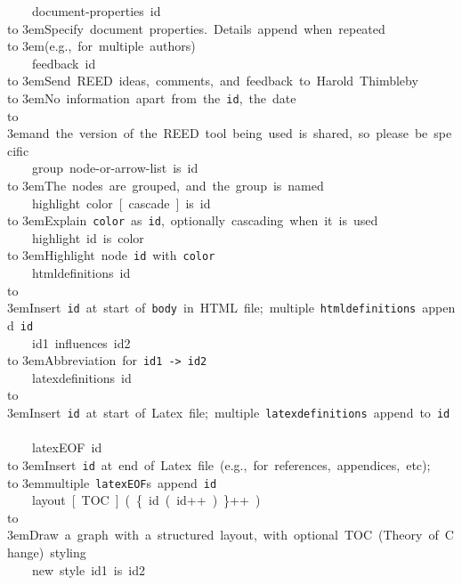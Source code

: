 {\hbox{}~~~~document-properties~id\\
\hbox to 3em{}{\rm Specify~document~properties.~Details~append~when~repeated}\\
\hbox to 3em{}{\rm (e.g.,~for~multiple~authors)}\\
\hbox{}~~~~feedback~id\\
\hbox to 3em{}{\rm Send~REED~ideas,~comments,~and~feedback~to~Harold~Thimbleby}\\
\hbox to 3em{}{\rm No~information~apart~from~the~\texttt{id},~the~date~}\\
\hbox to 3em{}{\rm and~the~version~of~the~REED~tool~being~used~is~shared,~so~please~be~specific}\\
\hbox{}~~~~group~node-or-arrow-list~is~id\\
\hbox to 3em{}{\rm The~nodes~are~grouped,~and~the~group~is~named}\\
\hbox{}~~~~highlight~color~[~cascade~]~is~id\\
\hbox to 3em{}{\rm Explain~\texttt{color}~as~\texttt{id},~optionally~cascading~when~it~is~used}\\
\hbox{}~~~~highlight~id~is~color\\
\hbox to 3em{}{\rm Highlight~node~\texttt{id}~with~\texttt{color}}\\
\hbox{}~~~~htmldefinitions~id\\
\hbox to 3em{}{\rm Insert~\texttt{id}~at~start~of~\texttt{body}~in~HTML~file;~multiple~\texttt{htmldefinitions}~append~\texttt{id}}\\
\hbox{}~~~~id1~influences~id2\\
\hbox to 3em{}{\rm Abbreviation~for~\texttt{id1}~\texttt{->}~\texttt{id2}}\\
\hbox{}~~~~latexdefinitions~id\\
\hbox to 3em{}{\rm Insert~\texttt{id}~at~start~of~Latex~file;~multiple~\texttt{latexdefinitions}~append~to~\texttt{id}~}\\
\hbox{}~~~~latexEOF~id\\
\hbox to 3em{}{\rm Insert~\texttt{id}~at~end~of~Latex~file~(e.g.,~for~references,~appendices,~etc);}\\
\hbox to 3em{}{\rm multiple~\texttt{latexEOF}s~append~\texttt{id}~}\\
\hbox{}~~~~layout~[~TOC~]~(~\{~id~(~id++~)~\}++~)\\
\hbox to 3em{}{\rm Draw~a~graph~with~a~structured~layout,~with~optional~TOC~(Theory~of~Change)~styling}\\
\hbox{}~~~~new~style~id1~is~id2\\
}
